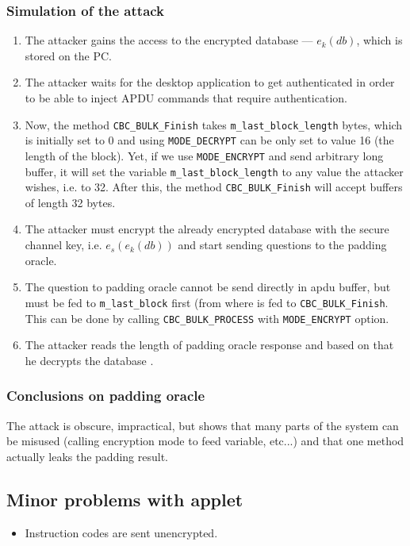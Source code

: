 \documentclass[11pt,a4paper]{article}
\begin{document}
\subsubsection*{Simulation of the attack}
\begin{enumerate}
	\item The attacker gains the access to the encrypted database --- $e_k(db)$, which is stored on the PC.
	\item The attacker waits for the desktop application to get authenticated in order to be able to inject APDU commands that require authentication.
	\item Now, the method \texttt{CBC\_BULK\_Finish} takes \texttt{m\_last\_block\_length} bytes, which is initially set to 0 and using \texttt{MODE\_DECRYPT} can be only set to value 16 (the length of the block). 
	    Yet, if we use \texttt{MODE\_ENCRYPT} and send arbitrary long buffer, it will set the variable \texttt{m\_last\_block\_length} to any value the attacker wishes, i.e. to 32. After this, the method \texttt{CBC\_BULK\_Finish} will accept buffers of length 32 bytes. 
	\item The attacker must encrypt the already encrypted database with the secure channel key, i.e. $e_s(e_k(db))$ and start sending questions to the padding oracle.
	\item The question to padding oracle cannot be send directly in apdu buffer, but must be fed to \texttt{m\_last\_block} first (from where is fed to \texttt{CBC\_BULK\_Finish}. This can be done by calling \texttt{CBC\_BULK\_PROCESS} with \texttt{MODE\_ENCRYPT} option.
	\item The attacker reads the length of padding oracle response and based on that he decrypts the database .
\end{enumerate}

\subsubsection*{Conclusions on padding oracle}

The attack is obscure, impractical, but shows that many parts of the system can be misused (calling encryption mode to feed variable, etc...) and that one method actually leaks the padding result. 


\subsection*{Minor problems with applet}

\begin{itemize}
	\item Instruction codes are sent unencrypted.
\end{itemize}
\end{document}
